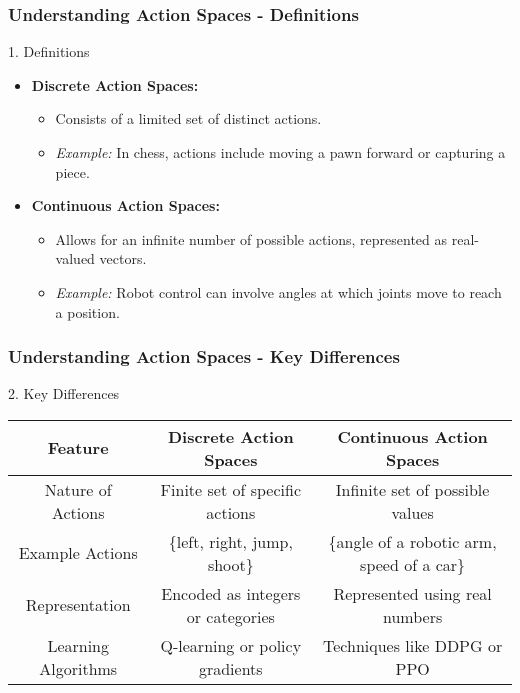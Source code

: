 \documentclass[aspectratio=169]{beamer}
\begin{document}
\begin{frame}[fragile]
    \frametitle{Understanding Action Spaces - Definitions}
    \begin{block}{1. Definitions}
        \begin{itemize}
            \item \textbf{Discrete Action Spaces:}
                \begin{itemize}
                    \item Consists of a limited set of distinct actions.
                    \item \textit{Example:} In chess, actions include moving a pawn forward or capturing a piece.
                \end{itemize}
            \item \textbf{Continuous Action Spaces:}
                \begin{itemize}
                    \item Allows for an infinite number of possible actions, represented as real-valued vectors.
                    \item \textit{Example:} Robot control can involve angles at which joints move to reach a position.
                \end{itemize}
        \end{itemize}
    \end{block}
\end{frame}

\begin{frame}[fragile]
    \frametitle{Understanding Action Spaces - Key Differences}
    \begin{block}{2. Key Differences}
        \begin{center}
            \begin{tabular}{|c|c|c|}
                \hline
                \textbf{Feature} & \textbf{Discrete Action Spaces} & \textbf{Continuous Action Spaces} \\
                \hline
                Nature of Actions & Finite set of specific actions & Infinite set of possible values \\
                Example Actions & \{left, right, jump, shoot\} & \{angle of a robotic arm, speed of a car\} \\
                Representation & Encoded as integers or categories & Represented using real numbers \\
                Learning Algorithms & Q-learning or policy gradients & Techniques like DDPG or PPO \\
                \hline
            \end{tabular}
        \end{center}
    \end{block}
\end{frame}
\end{document}
